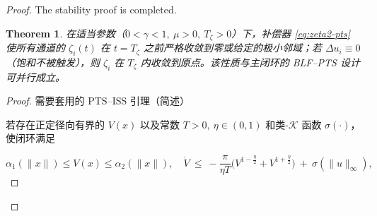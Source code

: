 \documentclass[pdflatex,sn-mathphys-num]{sn-jnl}%
\theoremstyle{thmstyleone}%
\newtheorem{theorem}{Theorem}%
\theoremstyle{thmstyletwo}%
\newtheorem{remark}{Remark}%
\theoremstyle{thmstylethree}%
\begin{document}
\begin{proof}
The stability proof is completed.





\begin{theorem}\label{thm:u-only}
	在适当参数（$0<\gamma<1,\ \mu>0,\ T_\zeta>0$）下，补偿器 \eqref{eq:zeta2-pts} 使所有通道的 $\zeta_{i}(t)$ 在 $t=T_\zeta$ 之前严格收敛到零或给定的极小邻域；若 $\Delta u_i\equiv 0$（饱和不被触发），则 $\zeta_{i}$ 在 $T_\zeta$ 内收敛到原点。该性质与主闭环的 BLF–PTS 设计可并行成立。
	\end{theorem}
	
	\begin{proof}
	
	
	 需要套用的 PTS–ISS 引理（简述）
	
	若存在正定径向有界的 $V(x)$ 以及常数 $T>0,\ \eta\in(0,1)$ 和类-$\mathcal K$ 函数 $\sigma(\cdot)$，使闭环满足
	
	$$
	\alpha_1(\|x\|)\le V(x)\le \alpha_2(\|x\|),\quad
	\dot V \ \le\ -\frac{\pi}{\eta T}\Big(V^{1-\frac{\eta}{2}}+V^{1+\frac{\eta}{2}}\Big)\ +\ \sigma(\|u\|_\infty),
	$$
	

\end{proof}
\end{proof}
\end{document}
